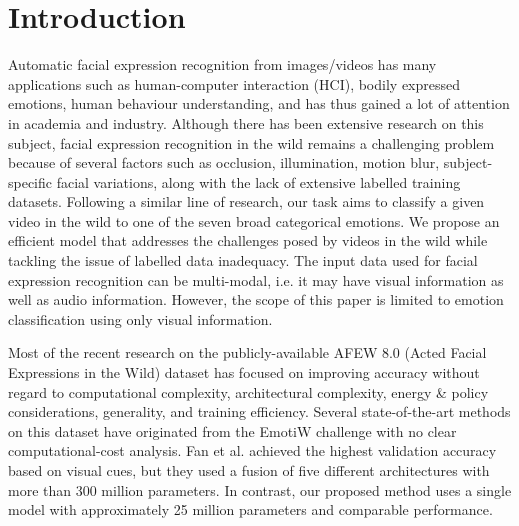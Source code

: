 \documentclass[runningheads]{llncs}
\begin{document}
\section{Introduction}
Automatic facial expression recognition from images/videos has many applications such as human-computer interaction (HCI), bodily expressed emotions, human behaviour understanding, and has thus gained a lot of attention in academia and industry. Although there has been extensive research on this subject, facial expression recognition in the wild remains a challenging problem because of several factors such as occlusion, illumination, motion blur, subject-specific facial variations, along with the lack of extensive labelled training datasets. Following a similar line of research, our task aims to classify a given video in the wild to one of the seven broad categorical emotions. We propose an efficient model that addresses the challenges posed by videos in the wild while tackling the issue of labelled data inadequacy. The input data used for facial expression recognition can be multi-modal, i.e. it may have visual information as well as audio information. However, the scope of this paper is limited to emotion classification using only visual information.

Most of the recent research on the publicly-available AFEW 8.0 (Acted Facial Expressions in the Wild) \cite{dhall2012collecting} dataset has focused on improving accuracy without regard to computational complexity, architectural complexity, energy \& policy considerations, generality, and training efficiency. Several state-of-the-art methods \cite{fan2018video,lu2018multiple,vielzeuf2017temporal} on this dataset have originated from the EmotiW \cite{dhall2019emotiw} challenge with no clear computational-cost analysis. Fan et al. \cite{fan2018video} achieved the highest validation accuracy based on visual cues, but they used a fusion of five different architectures with more than 300 million parameters. In contrast, our proposed method uses a single model with approximately 25 million parameters and comparable performance.
\end{document}
